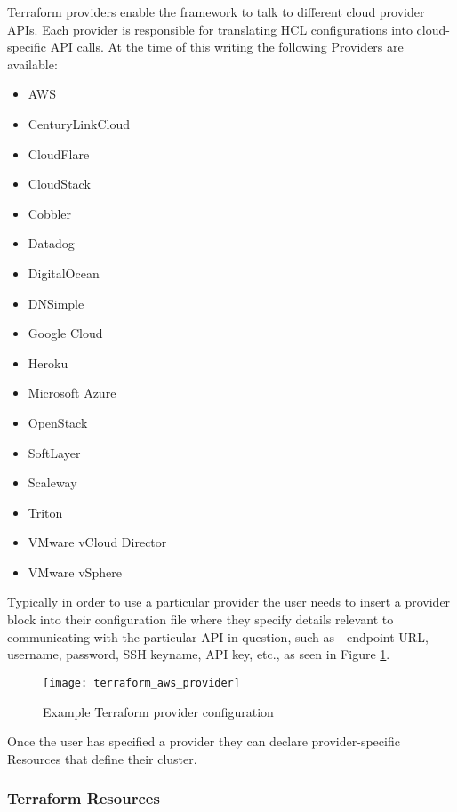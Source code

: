 Terraform providers enable the framework to talk to different cloud provider APIs. Each provider is responsible for translating HCL configurations into cloud-specific API calls. At the time of this writing the following Providers are available:

\begin{multicols}{2}
\begin{itemize}
\item AWS
\item CenturyLinkCloud
\item CloudFlare
\item CloudStack
\item Cobbler
\item Datadog
\item DigitalOcean
\item DNSimple
\item Google Cloud
\item Heroku
\item Microsoft Azure
\item OpenStack
\item SoftLayer
\item Scaleway
\item Triton
\item VMware vCloud Director
\item VMware vSphere
\end{itemize}
\end{multicols}

Typically in order to use a particular provider the user needs to insert a provider block into their configuration file where they specify details relevant to communicating with the particular API in question, such as - endpoint URL, username, password, SSH keyname, API key, etc., as seen in Figure \ref{fig:terraform_aws_provider}. 

\begin{figure}[h]
\texttt{[image: terraform\_aws\_provider]}
\centering
\caption {Example Terraform provider configuration}
\label{fig:terraform_aws_provider}
\end{figure}

Once the user has specified a provider they can declare provider-specific Resources that define their cluster.

\subsubsection {Terraform Resources}

